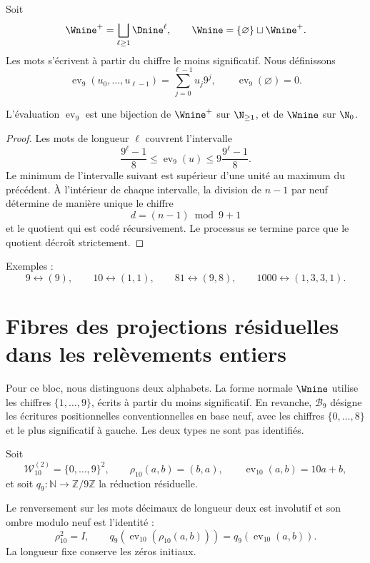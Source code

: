 \begin{definition}
Soit
\[
 \Wnine^+=\bigsqcup_{\ell\geq1}\Dnine^\ell,
 \qquad \Wnine=\{\varnothing\}\sqcup\Wnine^+.
\]
Les mots s'écrivent à partir du chiffre le moins significatif. Nous définissons
\[
 \operatorname{ev}_9(u_0,\ldots,u_{\ell-1})
 =\sum_{j=0}^{\ell-1}u_j9^j,
 \qquad \operatorname{ev}_9(\varnothing)=0.
\]
\end{definition}

\begin{theorem}
L'évaluation $\operatorname{ev}_9$ est une bijection de $\Wnine^+$ sur
$\N_{\geq1}$, et de $\Wnine$ sur $\N_0$.
\end{theorem}

\begin{proof}
Les mots de longueur $\ell$ couvrent l'intervalle
\[
 \frac{9^\ell-1}{8}
 \leq \operatorname{ev}_9(u)
 \leq 9\frac{9^\ell-1}{8}.
\]
Le minimum de l'intervalle suivant est supérieur d'une unité au maximum du
précédent. À l'intérieur de chaque intervalle, la division de $n-1$ par neuf détermine
de manière unique le chiffre
\[
 d=(n-1)\bmod9+1
\]
et le quotient qui est codé récursivement. Le processus se termine parce que le
quotient décroît strictement.
\end{proof}

Exemples :
\[
 9\longleftrightarrow(9),\qquad
 10\longleftrightarrow(1,1),\qquad
 81\longleftrightarrow(9,8),\qquad
 1000\longleftrightarrow(1,3,3,1).
\]

\section{Fibres des projections résiduelles dans les relèvements entiers}

Pour ce bloc, nous distinguons deux alphabets. La forme normale
\(\Wnine\) utilise les chiffres \(\{1,\ldots,9\}\), écrits à partir du moins
significatif. En revanche, \(\mathscr B_9\) désigne les écritures positionnelles
conventionnelles en base neuf, avec les chiffres \(\{0,\ldots,8\}\) et le plus
significatif à gauche. Les deux types ne sont pas identifiés.

Soit
\[
 \mathscr W_{10}^{(2)}=\{0,\ldots,9\}^2,\qquad
 \rho_{10}(a,b)=(b,a),\qquad
 \operatorname{ev}_{10}(a,b)=10a+b,
\]
et soit \(q_9:\mathbb N\to\mathbb Z/9\mathbb Z\) la réduction résiduelle.

\begin{lemma}
\label{int:pf84:SYN30-RHO-DESC}
Le renversement sur les mots décimaux de longueur deux est involutif et son
ombre modulo neuf est l'identité :
\[
 \rho_{10}^2=I,\qquad
 q_9\!\left(\operatorname{ev}_{10}(\rho_{10}(a,b))\right)
 =
 q_9\!\left(\operatorname{ev}_{10}(a,b)\right).
\]
La longueur fixe conserve les zéros initiaux.
\end{lemma}

